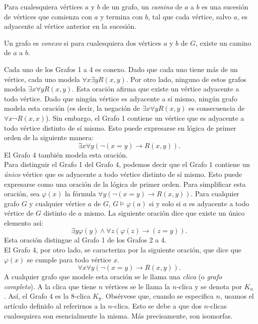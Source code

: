 \documentclass[12pt,a4paper]{book}
\begin{document}
    \begin{definicion}\label{def:camino-grafo}
        Para cualesquiera vértices $a$ y $b$ de un grafo, un \textit{camino} de $a$ a $b$ es una sucesión de vértices que
        comienza con $a$ y termina con $b$, tal que cada vértice, salvo $a$, es adyacente al vértice anterior en la
        sucesión.
    \end{definicion}

    \begin{definicion}[Conexo]\label{def:conexo}
        Un grafo es \textit{conexo} si para cualesquiera dos vértices $a$ y $b$ de $G$, existe un camino de $a$ a $b$.
    \end{definicion}

    Cada uno de los Grafos 1 a 4 es conexo. Dado que cada uno tiene más de un vértice, cada uno modela
    $\forall x\exists yR(x,y)$. Por otro lado, ninguno de estos grafos modela $\exists x\forall yR(x,y)$. Esta oración
    afirma que existe un vértice adyacente a todo vértice. Dado que ningún vértice es adyacente a sí mismo, ningún grafo
    modela esta oración (es decir, la negación de $\exists x\forall yR(x,y)$ es consecuencia de $\forall x\neg R(x,x)$).
    Sin embargo, el Grafo 1 contiene un vértice que es adyacente a todo vértice distinto de sí mismo. Esto puede expresarse
    en lógica de primer orden de la siguiente manera:
    \begin{equation*}
        \exists x\forall y(\neg(x=y)\rightarrow R(x,y)).
    \end{equation*}
    El Grafo 4 también modela esta oración.\\
    Para distinguir el Grafo 1 del Grafo 4, podemos decir que el Grafo 1 contiene un \textit{único} vértice que es
    adyacente a todo vértice distinto de sí mismo. Esto puede expresarse como una oración de la lógica de primer orden.
    Para simplificar esta oración, sea $\varphi(x)$ la fórmula $\forall y(\neg(x=y)\rightarrow R(x,y))$. Para cualquier
    grafo $G$ y cualquier vértice $a$ de $G$, $G\models\varphi(a)$ si y solo si $a$ es adyacente a todo vértice de $G$
    distinto de $a$ mismo. La siguiente oración dice que existe un único elemento así:
    \begin{equation*}
        \exists y\varphi(y)\wedge\forall z(\varphi(z)\rightarrow(z=y)).
    \end{equation*}
    Esta oración distingue al Grafo 1 de los Grafos 2 a 4.\\
    El Grafo 4, por otro lado, se caracteriza por la siguiente oración, que dice que $\varphi(x)$ se cumple para todo
    vértice $x$.
    \begin{equation*}
        \forall x\forall y(\neg(x=y)\rightarrow R(x,y)).
    \end{equation*}
    A cualquier grafo que modele esta oración se le llama una \textit{clica} (o \textit{grafo completo}). A la clica que
    tiene $n$ vértices se le llama la $n$-clica y se denota por $K_{n}$. Así, el Grafo 4 es la 8-clica $K_{8}$. Obsérvese
    que, cuando se especifica $n$, usamos el artículo definido al referirnos a la $n$-clica. Esto se debe a que dos
    $n$-clicas cualesquiera son esencialmente la misma. Más precisamente, son isomorfas.
\end{document}
